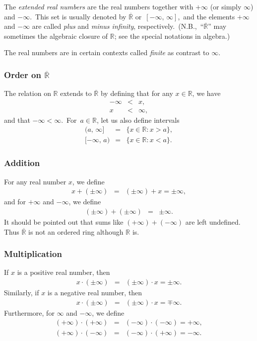 \documentclass[12pt]{article}
\newcommand{\sR}[0]{\mathbb{R}}
\begin{document}

The \emph{extended real numbers} are the real numbers together with 
$+\infty$ (or simply $\infty$) and $-\infty$.\, 
This set is usually denoted by $\overline{\sR}$ or\, $[-\infty,\,\infty]$,\,
and the elements $+\infty$ and $-\infty$ are called
\emph{plus} and \emph{minus infinity}, respectively.\, (N.B.,\, ``$\overline{\sR}$'' may sometimes  the algebraic closure of $\mathbb{R}$; see the special notations in algebra.) 

The real numbers are in certain contexts called {\em finite} as contrast to $\infty$.

\subsubsection{Order on $\overline{\sR}$}
The  relation on $\sR$ extends to $\overline{\sR}$ by
defining that for any $x\in \sR$, we have
\begin{eqnarray*}
-\infty&<& x, \\
x &<& \infty,
\end{eqnarray*}
and that $-\infty < \infty$.\, For\, $a\in\sR$, let us also define intervals 
\begin{eqnarray*}
(a,\,\infty{]} &=& \{x\in \sR: x>a \}, \\
{[}{-\infty},\,a) &=& \{x\in \sR: x<a \}.
\end{eqnarray*}

\subsubsection{Addition}
For any real number $x$, we define
\begin{eqnarray*}
 x + (\pm\infty) &=& (\pm\infty) + x = \pm\infty,
\end{eqnarray*}
and for $+\infty$ and $-\infty$, we define
\begin{eqnarray*}
(\pm \infty) + (\pm \infty) &=& \pm \infty.
\end{eqnarray*}
It should be pointed out that sums like $(+\infty) + (-\infty)$ 
are left undefined.\, Thus $\overline{\sR}$ is not an ordered ring
although $\sR$ is. 

\subsubsection{Multiplication}
If $x$ is a positive real number, then 
\begin{eqnarray*}
 x \cdot (\pm \infty) &=& (\pm\infty)\cdot x  = \pm\infty.
\end{eqnarray*}
Similarly, if $x$ is a negative real number, then 
\begin{eqnarray*}
 x \cdot (\pm \infty) &=& (\pm \infty)\cdot x = \mp\infty.
\end{eqnarray*}
Furthermore, for $\infty$ and $-\infty$, we define
\begin{eqnarray*}
(+\infty) \cdot(+\infty) &=& (-\infty)\cdot (-\infty) = +\infty, \\
(+\infty) \cdot (- \infty) &=& (-\infty)\cdot (+\infty) = -\infty. 
\end{eqnarray*}
\end{document}

